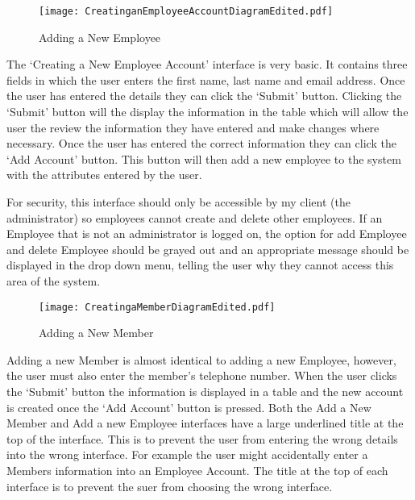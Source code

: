 \begin{figure}[H]
\caption{Adding a New Employee} \label{fig:Adding a New Employee Interface}
\hfill\texttt{[image: CreatinganEmployeeAccountDiagramEdited.pdf]}\hspace*{\fill}
\end{figure}

The `Creating a New Employee Account' interface is very basic. It contains three fields in which the user enters the first name, last name and email address. Once the user has entered the details they can click the `Submit' button. Clicking the `Submit' button will the display the information in the table which will allow the user the review the information they have entered and make changes where necessary. Once the user has entered the correct information they can click the `Add Account' button. This button will then add a new employee to the system with the attributes entered by the user. \par

For security, this interface should only be accessible by my client (the administrator) so employees cannot create and delete other employees. If an Employee that is not an administrator is logged on, the option for add Employee and delete Employee should be grayed out and an appropriate message should be displayed in the drop down menu, telling the user why they cannot access this area of the system. \par

\begin{figure}[H]
\caption{Adding a New Member} \label{fig:Adding a New Member Interface}
\hfill\texttt{[image: CreatingaMemberDiagramEdited.pdf]}\hspace*{\fill}
\end{figure}

Adding a new Member is almost identical to adding a new Employee, however, the user must also enter the member's telephone number. When the user clicks the `Submit' button the information is displayed in a table and the new account is created once the `Add Account' button is pressed. Both the Add a New Member and Add a new Employee interfaces have a large underlined title at the top of the interface. This is to prevent the user from entering the wrong details into the wrong interface. For example the user might accidentally enter a Members information into an Employee Account. The title at the top of each interface is to prevent the suer from choosing the wrong interface. \par

